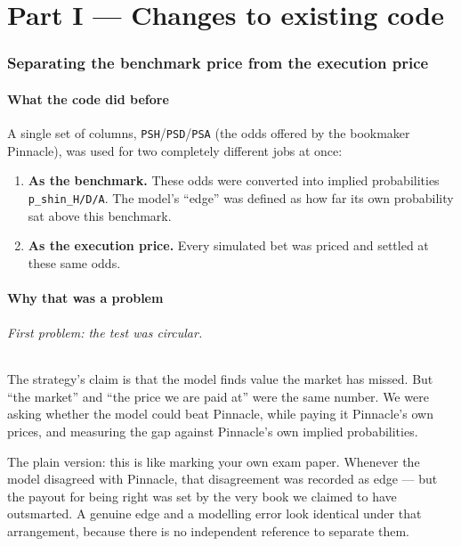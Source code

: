 \documentclass[11pt,a4paper]{article}
\newcommand{\code}[1]{\texttt{#1}}
\begin{document}
\part*{Part I --- Changes to existing code}

\section{Separating the benchmark price from the execution price}

\subsection{What the code did before}

A single set of columns, \code{PSH}/\code{PSD}/\code{PSA} (the odds offered
by the bookmaker Pinnacle), was used for two completely different jobs at
once:

\begin{enumerate}
  \item \textbf{As the benchmark.} These odds were converted into implied
        probabilities \code{p\_shin\_H/D/A}. The model's ``edge'' was
        defined as how far its own probability sat above this benchmark.
  \item \textbf{As the execution price.} Every simulated bet was priced and
        settled at these same odds.
\end{enumerate}

\subsection{Why that was a problem}

\paragraph{First problem: the test was circular.}
The strategy's claim is that the model finds value the market has missed.
But ``the market'' and ``the price we are paid at'' were the same number.
We were asking whether the model could beat Pinnacle, while paying it
Pinnacle's own prices, and measuring the gap against Pinnacle's own implied
probabilities.

The plain version: this is like marking your own exam paper. Whenever the
model disagreed with Pinnacle, that disagreement was recorded as edge --- but
the payout for being right was set by the very book we claimed to have
outsmarted. A genuine edge and a modelling error look identical under that
arrangement, because there is no independent reference to separate them.
\end{document}
